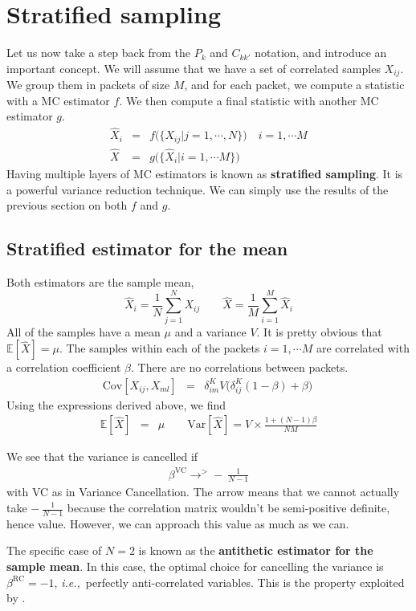 \documentclass{aastex6}
\newcommand{\ie}{{\textit{i.e.,}~}}
\newcommand{\equ}[1]{\begin{equation}#1\end{equation}}
\newcommand{\eqn}[1]{\begin{eqnarray}#1\end{eqnarray}}
\begin{document}
\section{Stratified sampling}

Let us now take a step back from the $P_k$ and $C_{kk'}$ notation, and introduce an important concept. 
We will assume that we have a set of correlated samples $X_{ij}$. 
We group them in packets of size $M$, and for each packet, we compute a statistic with a MC estimator $f$. 
We then compute a final statistic with another MC estimator $g$. 
\eqn{
	\hat{X}_i &=& f\bigl(\{X_{ij} | j=1, \cdots, N\}\bigr) \quad i=1, \cdots M \\
	\hat{X} &=& g\bigl(\{\hat{X}_i | i=1, \cdots M\}\bigr)
}
Having multiple layers of MC estimators is known as \textbf{stratified sampling}. It is a powerful variance reduction technique.
We can simply use the results of the previous section on both $f$ and $g$.

\subsection{Stratified estimator for the mean}

Both estimators are the sample mean,
\equ{
	\hat{X}_i = \frac{1}{N}\sum_{j=1}^N X_{ij}  \quad\quad \hat{X} =  \frac{1}{M}\sum_{i=1}^M \hat{X}_i 
	}
All of the samples have a mean $\mu$ and a variance $V$. It is pretty obvious that $\mathbb{E}[\hat{X}] = \mu$.
The samples within each of the packets $i=1, \cdots M$ are correlated with a correlation coefficient $\beta$. 
There are no correlations between packets.
\eqn{
	\mathrm{Cov}[X_{ij}, X_{ml}] &=& \delta^K_{im} V \bigl(\delta^K_{ij}(1-\beta) + \beta\bigr) \ 
}
Using the expressions derived above, we find
\eqn{
	\mathbb{E}[\hat{X}] &=& \mu\quad\quad
	\mathrm{Var}[\hat{X}] =  V \times \frac{1 + (N-1)\beta}{N M}
}

We see that the variance is cancelled if 
\eqn{
	\beta^\mathrm{VC} \rightarrow^{>} - \ \frac{1}{N-1}
}
with VC as in Variance Cancellation. The arrow means that we cannot actually take $- \ \frac{1}{N-1}$ because the correlation matrix wouldn't be semi-positive definite, hence value. However, we can approach this value as much as we can.

The specific case of $N=2$ is known as the \textbf{antithetic estimator for the sample mean}. In this case, the optimal choice for cancelling the variance is $\beta^\mathrm{RC}=-1$, \ie perfectly anti-correlated variables. 
This is the property exploited by \cite{PontzenEtAl2016}.
\end{document}
